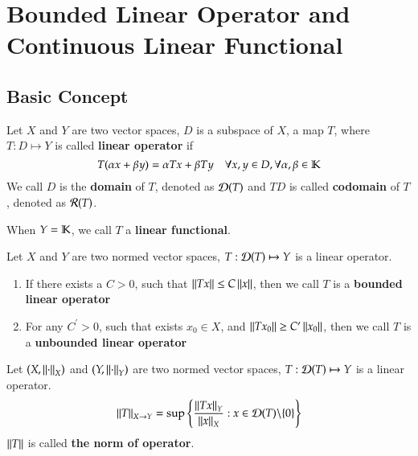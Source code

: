 \section{Bounded Linear Operator and Continuous Linear Functional}

\subsection{Basic Concept}

\begin{definition}\label{def:2.1}
Let $X$ and $Y$ are two vector spaces, $D$ is a subspace of $X$, a map $T$, where $T: D \mapsto Y$ is called \textbf{linear operator} if
\begin{equation*}
    T(\alpha x + \beta y) = \alpha Tx + \beta Ty \quad \forall x, y \in D, \forall \alpha, \beta \in \mathbb{K}
\end{equation*}
We call $D$ is the \textbf{domain} of $T$, denoted as $\mathcal{D}(T)$ and $TD$ is called \textbf{codomain} of $T$, denoted as $\mathcal{R}(T)$.

When $Y = \mathbb{K}$, we call $T$ a \textbf{linear functional}.
\end{definition}

\begin{definition}\label{def:2.2}
Let $X$ and $Y$ are two normed vector spaces, $T: \mathcal{D}(T) \mapsto Y$ is a linear operator.
\begin{enumerate}[itemsep=0pt, topsep=0pt]
    \item If there exists a $C > 0$, such that $\Norm{Tx} \leq C\Norm{x}$, then we call $T$ is a \textbf{bounded linear operator}
    \item For any $C^{\prime} > 0$, such that exists $x_0 \in X$, and $\Norm{Tx_0} \geq C^{\prime}\Norm{x_0}$, then we call $T$ is a \textbf{unbounded linear operator}
\end{enumerate}
\end{definition}

\begin{definition}\label{def:2.3}
Let $(X, \Norm{\cdot}_X)$ and $(Y, \Norm{\cdot}_Y)$ are two normed vector spaces, $T: \mathcal{D}(T) \mapsto Y$ is a linear operator.
\begin{equation*}
    \Norm{T}_{X \to Y} = \sup\left\{ \frac{\Norm{Tx}_Y}{\Norm{x}_X}: x\in \elD(T) \backslash \{0\} \right\}
\end{equation*}
$\Norm{T}$ is called \textbf{the norm of operator}.
\end{definition}


